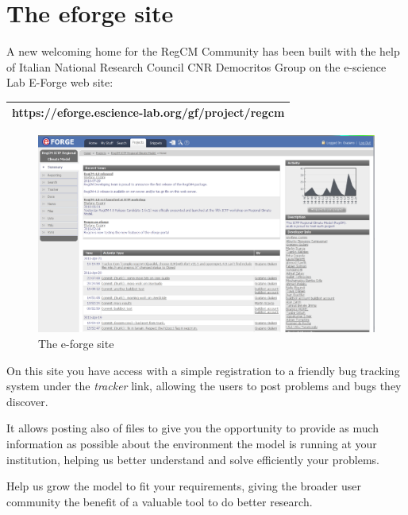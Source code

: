 %
%

\section{The eforge site}

A new welcoming home for the RegCM Community has been built with the help
of Italian National Research Council CNR Democritos Group on the e-science
Lab E-Forge web site:

\vspace{0.5cm}
\begin{tabular}{|c|}
\hline
{\bf https://eforge.escience-lab.org/gf/project/regcm} \\
\hline
\end{tabular}
\vspace{0.5cm}

\begin{figure}[h!]
\caption{The e-forge site}
\centering
\includegraphics[width=12cm]{e-forge}
\end{figure}

On this site you have access with a simple registration to a friendly
bug tracking system under the {\em tracker} link, allowing the users to
post problems and bugs they discover.

It allows posting also of files to give you the opportunity to provide as
much information as possible about the environment the model is running at
your institution, helping us better understand and solve efficiently your
problems.

Help us grow the model to fit your requirements, giving the broader user
community the benefit of a valuable tool to do better research.
